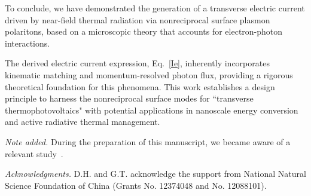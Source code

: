 \documentclass[aps,prl,twocolumn,longbibliography]{revtex4-2}
\begin{document}
To conclude, we have demonstrated the generation of a transverse electric current driven
by near-field thermal radiation via nonreciprocal surface plasmon polaritons, based on a
microscopic theory that accounts for electron-photon interactions.


The derived electric current expression, Eq.~\eqref{Ie}, inherently incorporates kinematic
matching and momentum-resolved photon flux, providing a rigorous theoretical foundation
for this phenomena. This work establishes a design principle to harness the nonreciprocal
surface modes for ``transverse thermophotovoltaics" with potential applications in
nanoscale energy conversion and active radiative thermal management.













{\it Note added.} During the preparation of this manuscript, we became aware of a relevant
study~\cite{photon_Nernst25}.

{\it Acknowledgments.}
D.H. and G.T. acknowledge the support from National Natural Science Foundation of China
(Grants No. 12374048 and No. 12088101).
\end{document}
